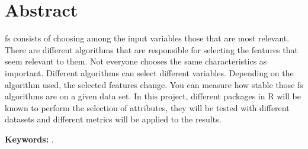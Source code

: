 \chapter*{Abstract}
\label{cha:abstract}


\acrfull{fs} consists of choosing among the input variables those that are most relevant. There are different algorithms that are responsible for selecting the features that seem relevant to them. Not everyone chooses the same characteristics as important. Different algorithms can select different variables. Depending on the algorithm used, the selected features change. You can measure how stable those \acrshort{fs} algorithms are on a given data set. In this project, different packages in R will be known to perform the selection of attributes, they will be tested with different datasets and different metrics will be applied to the results.

\textbf{Keywords:} \myThesisKeywordsEnglish.